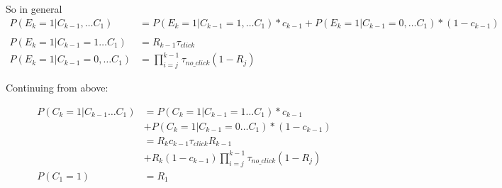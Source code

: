 \\
\\
So in general
\begin{align*}
P(E_k = 1 | C_{k-1}, \dots C_1) &= P(E_k = 1 | C_{k-1} = 1, \dots C_1) * c_{k-1} + P(E_k = 1 | C_{k-1} = 0, \dots C_1) * (1 - c_{k-1}) \\
\\
P(E_k = 1 | C_{k-1} = 1 \dots C_1) &= R_{k-1}\tau_{click} \\
P(E_k = 1 | C_{k-1} = 0, \dots C_1) &= \prod^{k-1}_{i = j}\tau_{no\_click} (1-R_j)
\end{align*} 

Continuing from above:

\begin{align*}
P(C_k = 1 |C_{k-1} \dots C_1)
&= P(C_k = 1 | C_{k-1}=1 \dots C_1) * c_{k-1} \\
&+ P(C_k = 1 | C_{k-1}=0 \dots C_1) * (1-c_{k-1}) \\
&= R_k c_{k-1}\tau_{click}R_{k-1} \\
&+ R_k (1-c_{k-1}) \prod^{k-1}_{i = j}\tau_{no\_click} (1-R_j) \\
P(C_1 = 1) &= R_1 \\
\end{align*}

